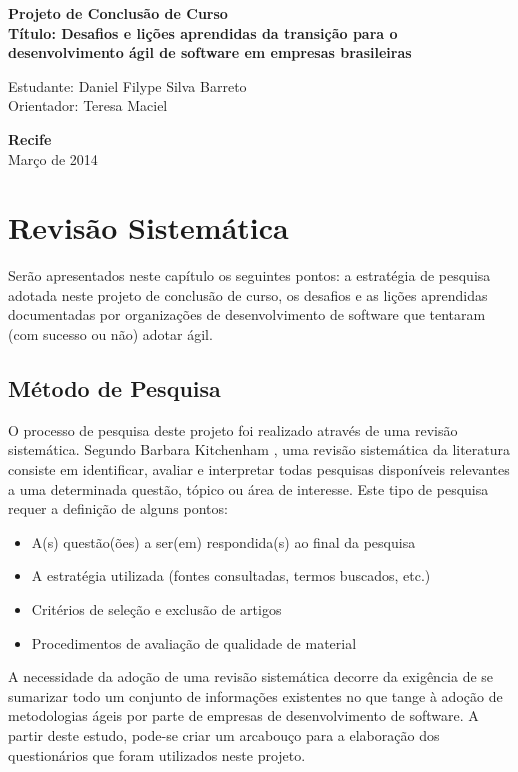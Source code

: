 \documentclass[a4paper,11pt]{article}
\begin{document}
\begin{center}
{\Large \bf  Projeto de Conclusão de Curso}\\[1cm]
{\Large \bf Título: Desafios e lições aprendidas da transição para o desenvolvimento ágil de software em empresas brasileiras} \\[3cm]
\end{center}
{\Large  Estudante: Daniel Filype Silva Barreto}\\[6mm]
{\Large  Orientador: Teresa Maciel}\\[6mm]
\vspace{3.0cm}
\begin{center}
{\large {\bf Recife}\\[6mm]
Março de 2014}
\end{center}
\newpage
\pagestyle {plain}
\setcounter{page}{0} 

\tableofcontents
\newpage

\listoftables
\newpage

\printnomenclature
\newpage

\listoffigures
\newpage

\section{Revisão Sistemática}
	Serão apresentados neste capítulo os seguintes pontos: a estratégia de pesquisa adotada neste projeto de conclusão de curso, os desafios e as lições aprendidas documentadas por organizações de desenvolvimento de software que tentaram (com sucesso ou não) adotar ágil.
	\subsection{Método de Pesquisa}
		O processo de pesquisa deste projeto foi realizado através de  uma revisão sistemática. Segundo Barbara Kitchenham \cite{Barbara04}, uma revisão sistemática da literatura consiste em identificar, avaliar e interpretar todas pesquisas disponíveis relevantes a uma determinada questão, tópico ou área de interesse. Este tipo de pesquisa requer a definição de alguns pontos:
		\begin{itemize}
			\item A(s) questão(ões) a ser(em) respondida(s) ao final da pesquisa
			\item A estratégia utilizada (fontes consultadas, termos buscados, etc.)
			\item Critérios de seleção e exclusão de artigos
			\item Procedimentos de avaliação de qualidade de material
		\end{itemize}
		A necessidade da adoção de uma revisão sistemática decorre da exigência de se sumarizar todo um conjunto de informações existentes no que tange à adoção de metodologias ágeis por parte de empresas de desenvolvimento de software. A partir deste estudo, pode-se criar um arcabouço para a elaboração dos questionários que foram utilizados neste projeto.
\end{document}

